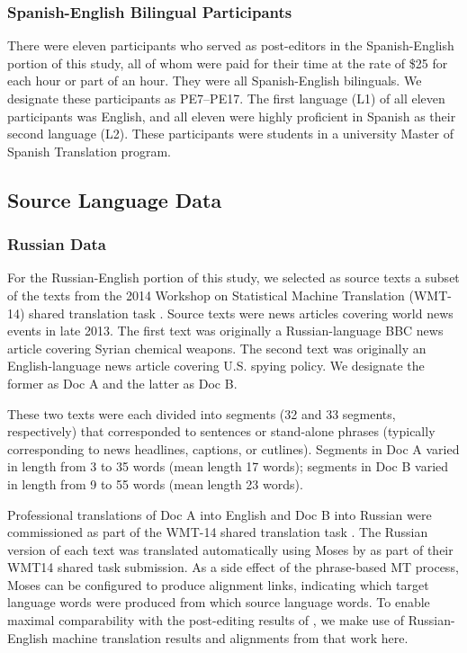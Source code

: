 \subsubsection{Spanish-English Bilingual Participants}

There were eleven participants who served as post-editors in the Spanish-English portion of this study, all of whom were paid for their time at the rate of \$25 for each hour or part of an hour. 
%
They were all Spanish-English bilinguals.
%
We designate these participants as PE7--PE17. 
%
The first language (L1) of all eleven participants was English, and all eleven were highly proficient in Spanish as their second language (L2). 
%
These participants were students in a university Master of Spanish Translation program. 

\subsection{Source Language Data}

\subsubsection{Russian Data}

For the Russian-English portion of this study, we selected as source texts a subset of the texts from the 2014 Workshop on Statistical Machine Translation (WMT-14) shared translation task \citep{2014_WMT_Bojar_etal}.
%
Source texts were news articles covering world news events in late 2013.
%
The first text was originally a Russian-language BBC news article covering Syrian chemical weapons.
%
The second text was originally an English-language news article covering U.S. spying policy.
%
We designate the former as Doc A and the latter as Doc B.

These two texts were each divided into segments (32 and 33 segments, respectively) that corresponded to sentences or stand-alone phrases (typically corresponding to news headlines, captions, or cutlines).
%
Segments in Doc A varied in length from 3 to 35 words (mean length 17 words); 
%
segments in Doc B varied in length from 9 to 55 words (mean length 23 words).


Professional translations of Doc A into English and Doc B into Russian were commissioned as part of the WMT-14 shared translation task \citep{2014_WMT_Bojar_etal}.
%
%
The Russian version of each text was translated automatically using Moses \citep{2007_ACL_Koehn} by \citet{2014_WMT_Schwartz_etal} as part of their WMT14 shared task submission.
%
As a side effect of the phrase-based MT process, Moses can be configured to produce alignment links, indicating which target language words were produced from which source language words.
%
To enable maximal comparability with the post-editing results of \citet{2014_WMT_Schwartz_etal}, we make use of Russian-English machine translation results and alignments from that work here.




